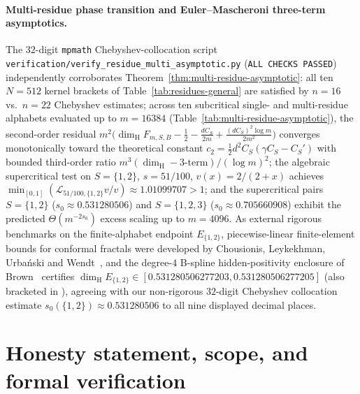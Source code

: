 \documentclass[11pt]{article}
\theoremstyle{definition}
\theoremstyle{remark}
\newcommand{\dimH}{\dim_{\mathrm{H}}}
\begin{document}
\paragraph{Multi-residue phase transition and Euler--Mascheroni three-term asymptotics.}
The $32$-digit \texttt{mpmath} Chebyshev-collocation script
\texttt{verification/\allowbreak verify\_\allowbreak residue\_\allowbreak multi\_\allowbreak asymptotic.py}
(\texttt{ALL CHECKS PASSED}) independently corroborates Theorem~\ref{thm:multi-residue-asymptotic}:
all ten $N=512$ kernel brackets of Table~\ref{tab:residues-general} are
satisfied by $n=16$ vs.\ $n=22$ Chebyshev estimates; across ten subcritical
single- and multi-residue alphabets evaluated up to $m=16384$
(Table~\ref{tab:multi-residue-asymptotic}), the second-order residual
$m^2\bigl(\dimH F_{m,S,B}-\frac12-\frac{dC_S}{2m}+\frac{(dC_S)^2\log m}{2m^2}\bigr)$
converges monotonically toward the theoretical constant
$c_2=\frac12 d^2 C_S(\gamma C_S-C_S')$ with bounded third-order ratio
$m^3(\dimH-\text{3-term})/(\log m)^2$; the algebraic supercritical test on
$S=\{1,2\}$, $s=51/100$, $v(x)=2/(2+x)$ achieves
$\min_{[0,1]}(\mathcal L_{51/100,\{1,2\}}v/v)\approx1.01099707>1$; and the
supercritical pairs $S=\{1,2\}$ ($s_0\approx0.531280506$) and $S=\{1,2,3\}$
($s_0\approx0.705660908$) exhibit the predicted $\Theta(m^{-2s_0})$ excess
scaling up to $m=4096$.
As external rigorous benchmarks on the finite-alphabet endpoint $E_{\{1,2\}}$,
piecewise-linear finite-element bounds for conformal fractals were developed by
Chousionis, Leykekhman, Urba\'nski and Wendt~\cite{CLUW2024}, and the degree-$4$
B-spline hidden-positivity enclosure of Brown~\cite{Brown2026} certifies
$\dimH E_{\{1,2\}}\in[0.531280506277203, 0.531280506277205]$ (also bracketed in
\cite[Table~1]{CLN2026}), agreeing with our non-rigorous $32$-digit Chebyshev
collocation estimate $s_0(\{1,2\})\approx0.531280506$ to all nine displayed decimal places.

\section{Honesty statement, scope, and formal verification}\label{sec:verification}
\end{document}
